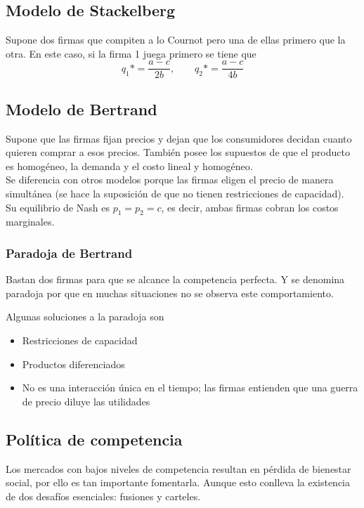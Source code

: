 \subsection{Modelo de Stackelberg}

Supone dos firmas que compiten a lo Cournot pero una de ellas  primero que la otra. En este caso, si la firma 1 juega primero se tiene que 
\[q_1*=\frac{a-c}{2b}, \quad \quad q_2*=\frac{a-c}{4b}\]

\subsection{Modelo de Bertrand}

Supone que las firmas fijan precios y dejan que los consumidores decidan cuanto quieren comprar a esos precios. También posee los supuestos de que el producto es homogéneo, la demanda y el costo lineal y homogéneo.\\

Se diferencia con otros modelos porque las firmas eligen el precio de manera simultánea (se hace la suposición de que no tienen restricciones de capacidad).\\

Su equilibrio de Nash es $p_1=p_2=c$, es decir, ambas firmas cobran los costos marginales.

\subsubsection{Paradoja de Bertrand}

Bastan dos firmas para que se alcance la competencia perfecta. Y se denomina paradoja por que en muchas situaciones no se observa este comportamiento.


Algunas soluciones a la paradoja son
\begin{itemize}
    \item Restricciones de capacidad
    \item Productos diferenciados
    \item No es una interacción única en el tiempo; las firmas entienden que una guerra de precio diluye las utilidades
\end{itemize}

\subsection{Política de competencia}
Los mercados con bajos niveles de competencia resultan en pérdida de bienestar social, por ello es tan importante fomentarla. Aunque esto conlleva la existencia de dos desafíos esenciales: fusiones y carteles.

